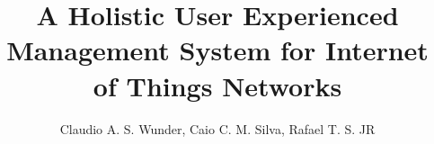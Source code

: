 \documentclass[3p,times]{elsarticle}
\begin{document}
\begin{frontmatter}



\dochead{}

\title{A Holistic User Experienced Management System for Internet of Things Networks}


\author{Claudio A. S. Wunder, Caio C. M. Silva, Rafael T. S. JR}

\address{}

\begin{abstract}
\end{abstract}

\begin{keyword}


\end{keyword}

\end{frontmatter}


\end{document}
